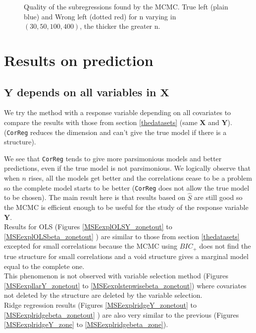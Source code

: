 \documentclass[12pt,a4paper]{report}
\begin{document}
\begin{figure}[h!]
	 \quad
	\caption{Quality of the subregressions found by the MCMC. True left (plain blue) and Wrong left (dotted red) for n varying in $(30,50,100,400)$, the thicker the greater n.}\label{compZBIC}
\end{figure}




\clearpage
\section{Results on prediction}\label{compY}
\subsection{$\boldsymbol{Y}$ depends on all variables in $\boldsymbol{X}$}	 \label{explsimtout}	
We try the method with a response variable depending on all covariates to compare the results with those from section \ref{thedatasets} (same $\boldsymbol{X}$ and $\boldsymbol{Y}$). ({\tt CorReg} reduces the dimension and can't give the true model if there is a structure). %

 We see that {\tt CorReg} tends to give more parsimonious models and better predictions, even if the true model is not parsimonious. We logically observe that when $n$ rises, all the models get better and the correlations cease to be a problem so the complete model starts to be better ({\tt CorReg} does not allow the true model to be chosen). The main result here is that results based on $\hat{S}$ are still good so the MCMC is efficient enough to be useful for the study of the response variable $\boldsymbol{Y}$. \\
 
 Results for OLS (Figures \ref{MSEexplOLSY_zonetout} to \ref{MSEexplOLSbeta_zonetout} ) are similar to those from section \ref{thedatasets} excepted for small correlations because the MCMC using $BIC_+$ does not find the true structure for small correlations and a void structure gives a marginal model equal to the complete one.  \\
 This phenomenon is not observed with variable selection method (Figures \ref{MSEexpllarY_zonetout} to \ref{MSEexplstepwisebeta_zonetout}) where covariates not deleted by the structure are deleted by the variable selection. \\
 Ridge regression results (Figures \ref{MSEexplridgeY_zonetout} to \ref{MSEexplridgebeta_zonetout} ) are also very similar to the previous (Figures \ref{MSEexplridgeY_zone} to \ref{MSEexplridgebeta_zone}).\\
 
\end{document}
